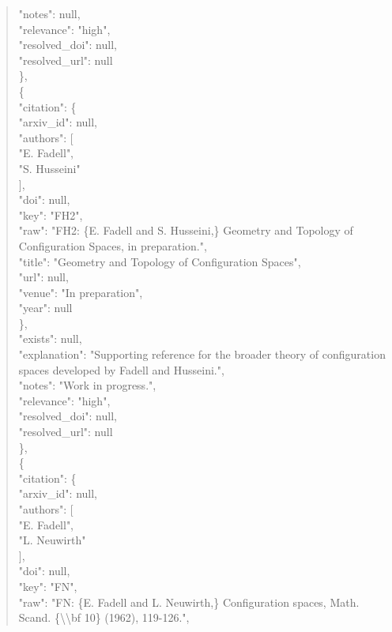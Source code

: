 \documentclass[11pt]{article}
\begin{document}
\begin{quote}
      "notes": null,\\
      "relevance": "high",\\
      "resolved\_doi": null,\\
      "resolved\_url": null\\
    \},\\
    \{\\
      "citation": \{\\
        "arxiv\_id": null,\\
        "authors": [\\
          "E. Fadell",\\
          "S. Husseini"\\
        ],\\
        "doi": null,\\
        "key": "FH2",\\
        "raw": "FH2: \{E. Fadell and S. Husseini,\} Geometry and Topology of Configuration Spaces, in preparation.",\\
        "title": "Geometry and Topology of Configuration Spaces",\\
        "url": null,\\
        "venue": "In preparation",\\
        "year": null\\
      \},\\
      "exists": null,\\
      "explanation": "Supporting reference for the broader theory of configuration spaces developed by Fadell and Husseini.",\\
      "notes": "Work in progress.",\\
      "relevance": "high",\\
      "resolved\_doi": null,\\
      "resolved\_url": null\\
    \},\\
    \{\\
      "citation": \{\\
        "arxiv\_id": null,\\
        "authors": [\\
          "E. Fadell",\\
          "L. Neuwirth"\\
        ],\\
        "doi": null,\\
        "key": "FN",\\
        "raw": "FN: \{E. Fadell and L. Neuwirth,\} Configuration spaces, Math. Scand. \{\textbackslash{}\textbackslash{}bf 10\} (1962), 119-126.",\\

\end{quote}
\end{document}
